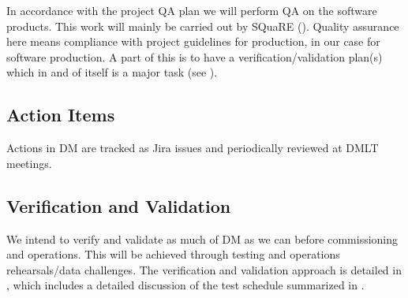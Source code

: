 In accordance with the project \gls{QA} plan  we will perform \gls{QA} on the software products.
This work will mainly be carried out by \gls{SQuaRE} ().
Quality assurance here means compliance with project guidelines for production, in our case for software production.
A part of this is to have a verification/validation plan(s) which in and of itself is a major task (see ).


\subsection{Action Items }
Actions in \gls{DM} are tracked as Jira issues and periodically reviewed at \gls{DMLT} meetings.


\subsection {Verification and \gls{Validation} } \label{sect:vanv}

We intend to verify and validate as much of \gls{DM} as we can before commissioning and operations.
This will be achieved through testing and operations rehearsals/data challenges.
The verification and validation approach is detailed in , which includes a detailed discussion of the test schedule summarized in .
